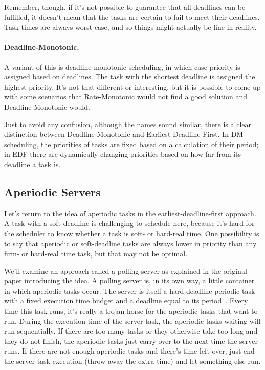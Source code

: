 Remember, though, if it's not possible to guarantee that all deadlines can be fulfilled, it doesn't mean that the tasks are certain to fail to meet their deadlines. Task times are always worst-case, and so things might actually be fine in reality.

\paragraph{Deadline-Monotonic.} A variant of this is deadline-monotonic scheduling, in which case priority is assigned based on deadlines. The task with the shortest deadline is assigned the highest priority. It's not that different or interesting, but it is possible to come up with some scenarios that Rate-Monotonic would not find a good solution and Deadline-Monotonic would.

Just to avoid any confusion, although the names sound similar, there is a clear distinction between Deadline-Monotonic and Earliest-Deadline-First. In DM scheduling, the priorities of tasks are fixed based on a calculation of their period; in EDF there are dynamically-changing priorities based on how far from its deadline a task is. 

\subsection*{Aperiodic Servers}
Let's return to the idea of aperiodic tasks in the earliest-deadline-first approach. A task with a soft deadline is challenging to schedule here, because it's hard for the scheduler to know whether a task is soft- or hard-real time. One possibility is to say that aperiodic or soft-deadline tasks are always lower in priority than any firm- or hard-real time task, but that may not be optimal. 

We'll examine an approach called a polling server as explained in the original paper introducing the idea. A polling server is, in its own way, a little container in which aperiodic tasks occur. The server is itself a hard-deadline periodic task with a fixed execution time budget and a deadline equal to its period~\cite{aperiodic-server}. Every time this task runs, it's really a trojan horse for the aperiodic tasks that want to run. During the execution time of the server task, the aperiodic tasks waiting will run sequentially. If there are too many tasks or they otherwise take too long and they do not finish, the aperiodic tasks just carry over to the next time the server runs. If there are not enough aperiodic tasks and there's time left over, just end the server task execution (throw away the extra time) and let something else run.

